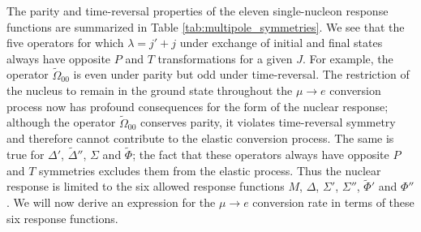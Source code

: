 \documentclass{book}[12pt]
\begin{document}
The parity and time-reversal properties of the eleven single-nucleon response functions are summarized in Table \ref{tab:multipole_symmetries}. We see that the five operators for which $\lambda=j'+j$ under exchange of initial and final states always have opposite $P$ and $T$ transformations for a given $J$. For example, the operator $\tilde{\Omega}_{00}$ is even under parity but odd under time-reversal. The restriction of the nucleus to remain in the ground state throughout the $\mu\rightarrow e$ conversion process now has profound consequences for the form of the nuclear response; although the operator $\tilde{\Omega}_{00}$ conserves parity, it violates time-reversal symmetry and therefore cannot contribute to the elastic conversion process. The same is true for $\Delta'$, $\tilde{\Delta}''$, $\Sigma$ and $\tilde{\Phi}$; the fact that these operators always have opposite $P$ and $T$ symmetries excludes them from the elastic process. Thus the nuclear response is limited to the six allowed response functions $M$, $\Delta$, $\Sigma'$, $\Sigma''$, $\tilde{\Phi}'$ and $\Phi''$. We will now derive an expression for the $\mu\rightarrow e$ conversion rate in terms of these six response functions.
\end{document}
